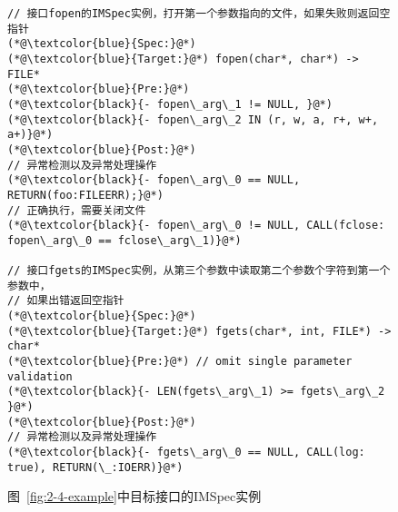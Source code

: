 \begin{figure}[!t]
	\centering
	\begin{lstlisting}
// 接口fopen的IMSpec实例，打开第一个参数指向的文件，如果失败则返回空指针
(*@\textcolor{blue}{Spec:}@*)
(*@\textcolor{blue}{Target:}@*) fopen(char*, char*) -> FILE*
(*@\textcolor{blue}{Pre:}@*) 
(*@\textcolor{black}{- fopen\_arg\_1 != NULL, }@*)
(*@\textcolor{black}{- fopen\_arg\_2 IN (r, w, a, r+, w+, a+)}@*)
(*@\textcolor{blue}{Post:}@*) 
// 异常检测以及异常处理操作
(*@\textcolor{black}{- fopen\_arg\_0 == NULL, RETURN(foo:FILEERR);}@*)
// 正确执行，需要关闭文件
(*@\textcolor{black}{- fopen\_arg\_0 != NULL, CALL(fclose: fopen\_arg\_0 == fclose\_arg\_1)}@*)

// 接口fgets的IMSpec实例，从第三个参数中读取第二个参数个字符到第一个参数中，
// 如果出错返回空指针
(*@\textcolor{blue}{Spec:}@*)
(*@\textcolor{blue}{Target:}@*) fgets(char*, int, FILE*) -> char*
(*@\textcolor{blue}{Pre:}@*) // omit single parameter validation
(*@\textcolor{black}{- LEN(fgets\_arg\_1) >= fgets\_arg\_2 }@*)
(*@\textcolor{blue}{Post:}@*)
// 异常检测以及异常处理操作 
(*@\textcolor{black}{- fgets\_arg\_0 == NULL, CALL(log: true), RETURN(\_:IOERR)}@*)
	\end{lstlisting}
	\caption{
		图~\ref{fig:2-4-example}中目标接口的IMSpec实例
	}
	\label{fig:2-4-example-imspec}
\end{figure}
